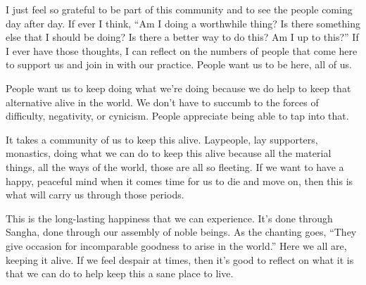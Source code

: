 I just feel so grateful to be part of this community and to see the people coming day after day. If ever I think, ``Am I doing a worthwhile thing? Is there something else that I should be doing? Is there a better way to do this? Am I up to this?'' If I ever have those thoughts, I can reflect on the numbers of people that come here to support us and join in with our practice. People want us to be here, all of us.

People want us to keep doing what we're doing because we do help to keep that alternative alive in the world. We don't have to succumb to the forces of difficulty, negativity, or cynicism. People appreciate being able to tap into that.

It takes a community of us to keep this alive. Laypeople, lay supporters, monastics, doing what we can do to keep this alive because all the material things, all the ways of the world, those are all so fleeting. If we want to have a happy, peaceful mind when it comes time for us to die and move on, then this is what will carry us through those periods.

This is the long-lasting happiness that we can experience. It's done through Sangha, done through our assembly of noble beings. As the chanting goes, ``They give occasion for incomparable goodness to arise in the world.'' Here we all are, keeping it alive. If we feel despair at times, then it's good to reflect on what it is that we can do to help keep this a sane place to live.
